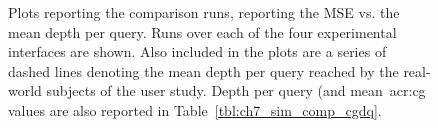 \begin{figure}[t!]
    \centering
    \caption[Comparison plots across each stopping strategy and interface]{Plots reporting the comparison runs, reporting the MSE vs. the mean depth per query. Runs over each of the four experimental interfaces are shown. Also included in the plots are a series of dashed lines denoting the mean depth per query reached by the real-world subjects of the user study. Depth per query (and mean~\gls{acr:cg} values are also reported in Table~\ref{tbl:ch7_sim_comp_cgdq}.}
    \label{fig:ch7_sim_comparison_plots}
\end{figure}

